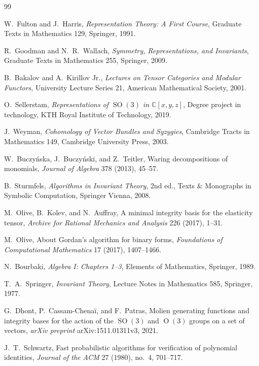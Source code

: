\documentclass[11pt]{article}
\newcommand{\dsC}{\mathbb{C}}
\newcommand{\SO}{\operatorname{SO}}
\newcommand{\Orth}{\operatorname{O}}
\theoremstyle{definition}
\begin{document}
\begin{thebibliography}{99}

  W.~Fulton and J.~Harris,
  \emph{Representation Theory: A First Course},
  Graduate Texts in Mathematics 129,
  Springer, 1991.

  R.~Goodman and N.~R.~Wallach,
  \emph{Symmetry, Representations, and Invariants},
  Graduate Texts in Mathematics 255,
  Springer, 2009.

  B.~Bakalov and A.~Kirillov Jr.,
  \emph{Lectures on Tensor Categories and Modular Functors},
  University Lecture Series 21,
  American Mathematical Society, 2001.

  O.~Sellerstam,
  \emph{Representations of $\SO(3)$ in $\dsC[x,y,z]$},
  Degree project in technology, KTH Royal Institute of Technology, 2019.

  J.~Weyman,
  \emph{Cohomology of Vector Bundles and Syzygies},
  Cambridge Tracts in Mathematics 149,
  Cambridge University Press, 2003.

  W.~Buczy\'nska, J.~Buczy\'nski, and Z.~Teitler,
  Waring decompositions of monomials,
  \emph{Journal of Algebra} 378 (2013), 45--57.

  B.~Sturmfels,
  \emph{Algorithms in Invariant Theory},
  2nd ed.,
  Texts \& Monographs in Symbolic Computation,
  Springer Vienna, 2008.

  M.~Olive, B.~Kolev, and N.~Auffray,
  A minimal integrity basis for the elasticity tensor,
  \emph{Archive for Rational Mechanics and Analysis} 226 (2017), 1--31.

  M.~Olive,
  About Gordan's algorithm for binary forms,
  \emph{Foundations of Computational Mathematics} 17 (2017), 1407--1466.

  N.~Bourbaki,
  \emph{Algebra I: Chapters 1--3},
  Elements of Mathematics,
  Springer, 1989.

  T.~A.~Springer,
  \emph{Invariant Theory},
  Lecture Notes in Mathematics 585,
  Springer, 1977.

  G.~Dhont, P.~Cassam-Chena\"i, and F.~Patras,
  Molien generating functions and integrity bases for the action of the $\SO(3)$ and $\Orth(3)$ groups on a set of vectors,
  \emph{arXiv preprint} arXiv:1511.01311v3, 2021.

  J.~T.~Schwartz,
  Fast probabilistic algorithms for verification of polynomial identities,
  \emph{Journal of the ACM} 27 (1980), no.~4, 701--717.


\end{thebibliography}
\end{document}
